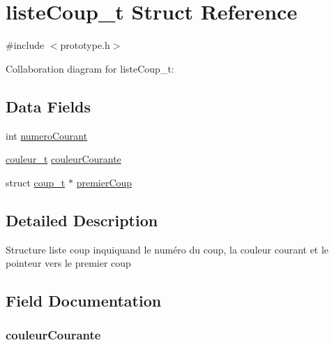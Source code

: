 \hypertarget{structliste_coup__t}{}\section{liste\+Coup\+\_\+t Struct Reference}
\label{structliste_coup__t}


{\ttfamily \#include $<$prototype.\+h$>$}



Collaboration diagram for liste\+Coup\+\_\+t\+:
\subsection*{Data Fields}
\begin{DoxyCompactItemize}
\item 
int \hyperlink{structliste_coup__t_afeec6c52a772886929f8a6863490ff6c}{numero\+Courant}
\item 
\hyperlink{prototype_8h_a2fc0928aba15295ee980b903ed92f23f}{couleur\+\_\+t} \hyperlink{structliste_coup__t_a01f1dcd0783145237d55e59594c74c8b}{couleur\+Courante}
\item 
struct \hyperlink{structcoup__t}{coup\+\_\+t} $\ast$ \hyperlink{structliste_coup__t_a180af4ccdf501202989db6beffd4f9bb}{premier\+Coup}
\end{DoxyCompactItemize}


\subsection{Detailed Description}
Structure liste coup inquiquand le numéro du coup, la couleur courant et le pointeur vers le premier coup 

\subsection{Field Documentation}
\subsubsection[{\texorpdfstring{couleur\+Courante}{couleurCourante}}]{ couleur\+Courante}\hypertarget{structliste_coup__t_a01f1dcd0783145237d55e59594c74c8b}{}\label{structliste_coup__t_a01f1dcd0783145237d55e59594c74c8b}
